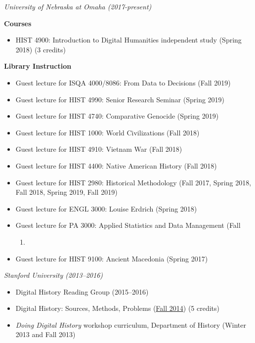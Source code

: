 \emph{University of Nebraska at Omaha (2017-present)}

\textbf{Courses}

\begin{itemize}
\tightlist
\item
  HIST 4900: Introduction to Digital Humanities independent study
  (Spring 2018) (3 credits)
\end{itemize}

\textbf{Library Instruction}

\begin{itemize}
\tightlist
\item
  Guest lecture for ISQA 4000/8086: From Data to Decisions (Fall 2019)
\item
  Guest lecture for HIST 4990: Senior Research Seminar (Spring 2019)
\item
  Guest lecture for HIST 4740: Comparative Genocide (Spring 2019)
\item
  Guest lecture for HIST 1000: World Civilizations (Fall 2018)
\item
  Guest lecture for HIST 4910: Vietnam War (Fall 2018)
\item
  Guest lecture for HIST 4400: Native American History (Fall 2018)
\item
  Guest lecture for HIST 2980: Historical Methodology (Fall 2017, Spring
  2018, Fall 2018, Spring 2019, Fall 2019)
\item
  Guest lecture for ENGL 3000: Louise Erdrich (Spring 2018)
\item
  Guest lecture for PA 3000: Applied Statistics and Data Management
  (Fall

  \begin{enumerate}
  \def\labelenumi{\arabic{enumi})}
  \setcounter{enumi}{2016}
  \item
  \end{enumerate}
\item
  Guest lecture for HIST 9100: Ancient Macedonia (Spring 2017)
\end{itemize}

\emph{Stanford University (2013--2016)}

\begin{itemize}
\tightlist
\item
  Digital History Reading Group (2015--2016)
\item
  Digital History: Sources, Methods, Problems
  (\href{http://jasonheppler.org/teaching/hist205f.2014/}{Fall 2014}) (5
  credits)
\item
  \emph{Doing Digital History} workshop curriculum, Department of
  History (Winter 2013 and Fall 2013)
\end{itemize}

